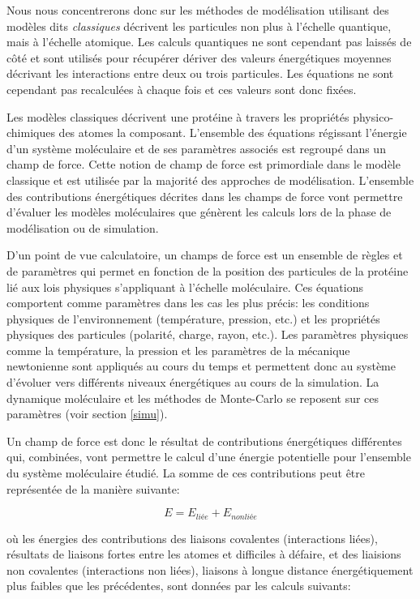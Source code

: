 Nous nous concentrerons donc sur les méthodes de modélisation utilisant des modèles dits \textit{classiques} décrivent les particules non plus à l'échelle quantique, mais à l'échelle atomique. Les calculs quantiques ne sont cependant pas laissés de côté et sont utilisés pour récupérer dériver des valeurs énergétiques moyennes décrivant les interactions entre deux ou trois particules. Les équations ne sont cependant pas recalculées à chaque fois et ces valeurs sont donc fixées.

 \label{forcefield}

Les modèles classiques décrivent une protéine à travers les propriétés physico-chimiques des atomes la composant. L'ensemble des équations régissant l'énergie d'un système moléculaire et de ses paramètres associés est regroupé dans un champ de force. Cette notion de champ de force est primordiale dans le modèle classique et est utilisée par la majorité des approches de modélisation. L'ensemble des contributions énergétiques décrites dans les champs de force vont permettre d'évaluer les modèles moléculaires que génèrent les calculs lors de la phase de modélisation ou de simulation.

D'un point de vue calculatoire, un champs de force est un ensemble de règles et de paramètres qui permet en fonction de la position des particules de la protéine lié aux lois physiques s'appliquant à l'échelle moléculaire. Ces équations comportent comme paramètres dans les cas les plus précis: les conditions physiques de l'environnement (température, pression, etc.) et les propriétés physiques des particules (polarité, charge, rayon, etc.). Les paramètres physiques comme la température, la pression et les paramètres de la mécanique newtonienne sont appliqués au cours du temps et permettent donc au système d'évoluer vers différents niveaux énergétiques au cours de la simulation. La dynamique moléculaire et les méthodes de Monte-Carlo se reposent sur ces paramètres (voir section \ref{simu}). 

Un champ de force est donc le résultat de contributions énergétiques différentes qui, combinées, vont permettre le calcul d'une énergie potentielle pour l'ensemble du système moléculaire étudié. La somme de ces contributions peut être représentée de la manière suivante:

$$E = E_{liée} + E_{nonliée}$$

où les énergies des contributions des liaisons covalentes (interactions liées), résultats de liaisons fortes entre les atomes et difficiles à défaire, et des liaisions non covalentes (interactions non liées), liaisons à longue distance énergétiquement plus faibles que les précédentes, sont données par les calculs suivants:

